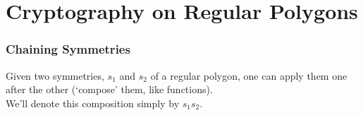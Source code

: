 \documentclass[aspectratio=169,11pt,svgnames,draft]{beamer}
\begin{document}
%

\section{Cryptography on Regular Polygons}

\begin{frame}
 \frametitle{Chaining Symmetries}
 Given two symmetries, $s_1$ and $s_2$ of a regular polygon, one can apply them
 one after the other (`compose' them, like functions).\\
 \pause
 We'll denote this composition simply by $s_1s_2$.
\end{frame}
\end{document}

